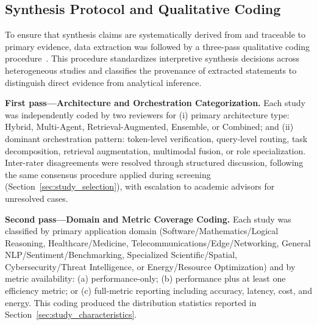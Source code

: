 \subsection{Synthesis Protocol and Qualitative Coding}
\label{sec:synthesis_protocol}

To ensure that synthesis claims are systematically derived from and traceable to primary evidence, data extraction was followed by a three-pass qualitative coding procedure~\cite{petersen2008systematic}. This procedure standardizes interpretive synthesis decisions across heterogeneous studies and classifies the provenance of extracted statements to distinguish direct evidence from analytical inference.

\textbf{First pass---Architecture and Orchestration Categorization.} Each study was independently coded by two reviewers for (i) primary architecture type: Hybrid, Multi-Agent, Retrieval-Augmented, Ensemble, or Combined; and (ii) dominant orchestration pattern: token-level verification, query-level routing, task decomposition, retrieval augmentation, multimodal fusion, or role specialization. Inter-rater disagreements were resolved through structured discussion, following the same consensus procedure applied during screening (Section~\ref{sec:study_selection}), with escalation to academic advisors for unresolved cases.

\textbf{Second pass---Domain and Metric Coverage Coding.} Each study was classified by primary application domain (Software/Mathematics/Logical Reasoning, Healthcare/Medicine, Telecommunications/Edge/Networking, General NLP/Sentiment/Benchmarking, Specialized Scientific/Spatial, Cybersecurity/Threat Intelligence, or Energy/Resource Optimization) and by metric availability: (a) performance-only; (b) performance plus at least one efficiency metric; or (c) full-metric reporting including accuracy, latency, cost, and energy. This coding produced the distribution statistics reported in Section~\ref{sec:study_characteristics}.

